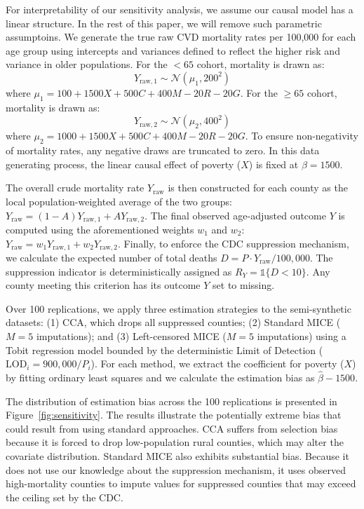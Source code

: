 \documentclass{article}
\theoremstyle{plain}
\theoremstyle{definition}
\theoremstyle{remark}
\begin{document}
For interpretability of our sensitivity analysis, we assume our causal model has a linear structure. In the rest of this paper, we will remove such parametric assumptoins. We generate the true raw CVD mortality rates per 100,000 for each age group 
using intercepts and variances defined to reflect the
higher risk and variance in older populations. For the $<65$ cohort, mortality 
is drawn as:
$$
Y_{\text{raw},1} \sim \mathcal{N}(\mu_1, 200^2)
$$
where $\mu_1 = 100 + 1500X + 500C + 400M - 20R - 20G$. For the $\geq65$ cohort, 
mortality is drawn as:
$$
Y_{\text{raw},2} \sim \mathcal{N}(\mu_2, 400^2)
$$
where $\mu_2 = 1000 + 1500X + 500C + 400M - 20R - 20G$. To ensure
non-negativity of mortality rates, any negative draws are truncated to zero. In this data generating process, the linear causal effect of
poverty ($X$) is fixed at $\beta = 1500$.

The overall crude mortality rate $Y_{\text{raw}}$ is then constructed for each 
county as the local population-weighted average of the two groups: $Y_{\text{raw}}=(1-A)Y_{\text{raw},1}+AY_{\text{raw},2}$.
The final 
observed age-adjusted outcome $Y$ is computed using the aforementioned weights 
$w_1$ and $w_2$: $Y_{\text{raw}}=w_1Y_{\text{raw},1}+w_2Y_{\text{raw},2}$.
Finally, to enforce the CDC suppression mechanism, we 
calculate the expected number of total deaths $D = P \cdot Y_{\text{raw}} / 100,000$. 
The suppression indicator is deterministically assigned as 
$R_Y = \mathds{1}\{D < 10\}$. Any county meeting this criterion has its 
outcome $Y$ set to missing.

Over 100 replications, we apply three estimation 
strategies to the semi-synthetic datasets: (1) CCA, 
which drops all suppressed counties; (2) Standard MICE ($M=5$ imputations); and (3) Left-censored MICE 
($M=5$ imputations) using a Tobit regression model bounded by the deterministic 
Limit of Detection ($\text{LOD}_i = 900,000 / P_i$). For each method, we extract 
the coefficient for poverty ($X$) by fitting ordinary least squares and we calculate the 
estimation bias as $\hat{\beta} - 1500$.

The distribution of estimation bias across the 100 replications is presented 
in Figure~\ref{fig:sensitivity}. The results illustrate the potentially extreme bias that could result from using standard approaches. CCA suffers from selection bias 
because it is forced to drop low-population rural counties, which may alter the covariate distribution. 
Standard MICE also exhibits substantial bias. Because it does not use our knowledge about the suppression mechanism, it uses observed high-mortality counties to impute 
values for suppressed counties that may exceed the ceiling set by the CDC.
\end{document}
